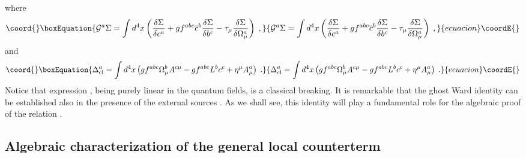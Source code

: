 \documentclass[a4paper,12pt]{article}
\begin{document}
\begin{itemize}
where 
\begin{equation}\coord{}\boxEquation{
\mathcal{G}^{a}\Sigma =\int d^{4}x\left( \frac{\delta \Sigma }{\delta c^{a}}
+gf^{abc}\overline{c}^{b}\frac{\delta \Sigma }{\delta b^{c}}-\tau _{\mu }
\frac{\delta \Sigma }{\delta \Omega _{\mu }^{a}}\right) \;,  \label{gop}
}{
\mathcal{G}^{a}\Sigma =\int d^{4}x\left( \frac{\delta \Sigma }{\delta c^{a}}
+gf^{abc}\overline{c}^{b}\frac{\delta \Sigma }{\delta b^{c}}-\tau _{\mu }
\frac{\delta \Sigma }{\delta \Omega _{\mu }^{a}}\right) \;,  }{ecuacion}\coordE{}\end{equation}
and 
\begin{equation}\coord{}\boxEquation{
\Delta _{\mathrm{cl}}^{a}=\int d^{4}x\left( gf^{abc}\Omega _{\mu
}^{b}A^{c\mu }-gf^{abc}L^{b}c^{c}+\eta ^{\mu }A_{\mu }^{a}\right) \;.
\label{dcl}
}{
\Delta _{\mathrm{cl}}^{a}=\int d^{4}x\left( gf^{abc}\Omega _{\mu
}^{b}A^{c\mu }-gf^{abc}L^{b}c^{c}+\eta ^{\mu }A_{\mu }^{a}\right) \;.
}{ecuacion}\coordE{}\end{equation}
Notice that expression \myHighlight{$\left( \ref{dcl}\right) $}\coordHE{}, being purely linear in
the quantum fields, is a classical breaking. It is remarkable that the ghost
Ward identity can be established also in the presence of the external
sources \coordHE{}. As we shall see, this
identity will play a fundamental role for the algebraic proof of the
relation \myHighlight{$\left( \ref{ga2}\right) $}\coordHE{}.
\end{itemize}

\subsection{Algebraic characterization of the general local counterterm}
\end{document}
